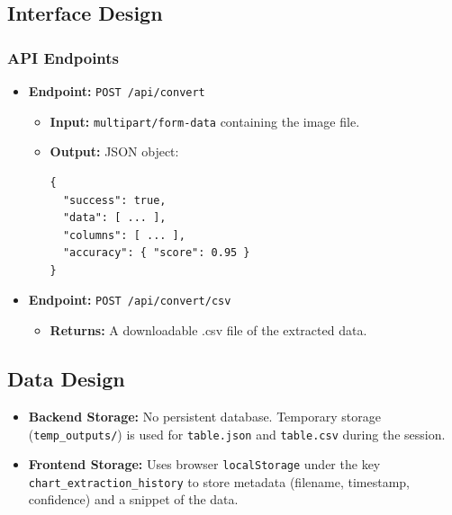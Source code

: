 \documentclass[12pt, a4paper]{article}
\begin{document}
\subsection{Interface Design}

\subsubsection{API Endpoints}
\begin{itemize}
    \item \textbf{Endpoint:} \texttt{POST /api/convert}
    \begin{itemize}
        \item \textbf{Input:} \texttt{multipart/form-data} containing the image file.
        \item \textbf{Output:} JSON object:
\begin{verbatim}
{
  "success": true,
  "data": [ ... ],
  "columns": [ ... ],
  "accuracy": { "score": 0.95 }
}
\end{verbatim}
    \end{itemize}
    \item \textbf{Endpoint:} \texttt{POST /api/convert/csv}
    \begin{itemize}
        \item \textbf{Returns:} A downloadable .csv file of the extracted data.
    \end{itemize}
\end{itemize}

\subsection{Data Design}
\begin{itemize}
    \item \textbf{Backend Storage:} No persistent database. Temporary storage (\texttt{temp\_outputs/}) is used for \texttt{table.json} and \texttt{table.csv} during the session.
    \item \textbf{Frontend Storage:} Uses browser \texttt{localStorage} under the key \texttt{chart\_extraction\_history} to store metadata (filename, timestamp, confidence) and a snippet of the data.
\end{itemize}
\end{document}
